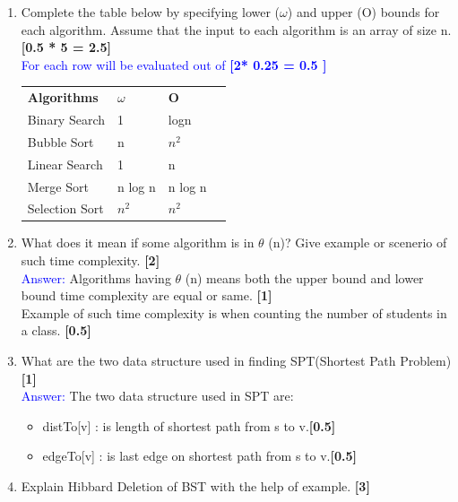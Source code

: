 \documentclass[12pt ,a4paper]{exam}
\begin{document}
	\begin{enumerate}[start=1,label={\bfseries Q\arabic*)}]
		\item Complete the table below by specifying lower ($\omega$) and upper (O) bounds for each algorithm. Assume that the input to each algorithm is an array of size n.  \hfill \textbf{ [0.5 * 5 = 2.5]}\\
		\textcolor{blue}{For each row will be evaluated out of  \hfill\textbf{ [2* 0.25 = 0.5 ]}	}
		
		\begin{table}[h]
			\centering
			\begin{tabular}{|l|l|l|l}
				\cline{1-3}
				\textbf{Algorithms} & \textbf{$\omega$} & \textbf{O}  &  \\ \cline{1-3}
				Binary Search &  1 &    logn  &  \\ \cline{1-3}
				Bubble Sort&  n &   $n^2$    &  \\ \cline{1-3}
				Linear Search&  1 &   n   &  \\ \cline{1-3}
				Merge Sort&   n log n & n log n    &  \\ \cline{1-3}
				Selection Sort &  $n^2$  &  $n^2$    &  \\ \cline{1-3}
			\end{tabular}
		\end{table}
		\item What does it mean if some algorithm is in $\theta$ (n)? Give example or scenerio of such time complexity. \hfill \textbf{[2]}\\
		\textcolor{blue}{Answer: } Algorithms having $\theta$ (n) means both the upper bound and lower bound time complexity are equal or same.  \hfill \textbf{[1]} \\
		Example of such time complexity is when counting the number of students in a class.  \hfill \textbf{[0.5]}
		\item What are the two data structure used in finding SPT(Shortest Path Problem) \hfill \textbf{[1]}\\
		\textcolor{blue}{Answer: }  The two data structure used in SPT are:
		\begin{itemize}
			\item distTo[v] : is length of shortest path from s to v.\hfill \textbf{[0.5]}
			\item edgeTo[v] : is last edge on shortest path from s to v.\hfill \textbf{[0.5]}
		\end{itemize}
		 \item Explain Hibbard Deletion of BST with the help of example. \hfill \textbf{[3]}\\

\end{enumerate}
\end{document}
